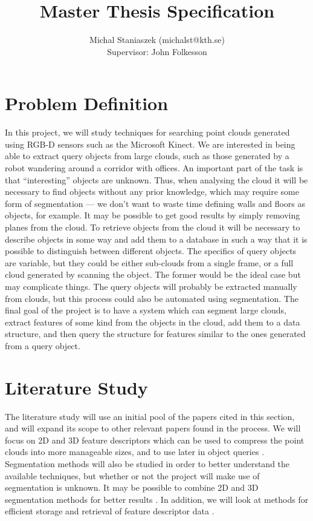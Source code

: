 \documentclass[10pt,a4paper]{article}
\author{Michal Staniaszek (michalst@kth.se)\\ Supervisor: John Folkesson}
\title{Master Thesis Specification}
\begin{document}
\maketitle
\section{Problem Definition}
In this project, we will study techniques for searching point clouds generated
using RGB-D sensors such as the Microsoft Kinect. We are interested in being
able to extract query objects from large clouds, such as those generated by a
robot wandering around a corridor with offices. An important part of the task is
that ``interesting'' objects are unknown. Thus, when analysing the cloud it will
be necessary to find objects without any prior knowledge, which may require some
form of segmentation --- we don't want to waste time defining walls and floors
as objects, for example. It may be possible to get good results by simply
removing planes from the cloud. To retrieve objects from the cloud it will be
necessary to describe objects in some way and add them to a database in such a
way that it is possible to distinguish between different objects. The specifics
of query objects are variable, but they could be either sub-clouds from a single
frame, or a full cloud generated by scanning the object. The former would be the
ideal case but may complicate things. The query objects will probably be
extracted manually from clouds, but this process could also be automated using
segmentation. The final goal of the project is to have a system which can
segment large clouds, extract features of some kind from the objects in the
cloud, add them to a data structure, and then query the structure for features
similar to the ones generated from a query object.
\section{Literature Study}
The literature study will use an initial pool of the papers cited in this
section, and will expand its scope to other relevant papers found in the
process. We will focus on 2D and 3D feature descriptors which can be used to
compress the point clouds into more manageable sizes, and to use later in object
queries \cite{saenko2011practical, lai2011scalable, wohlkinger2011shape,
  mueller2013recognition, bo2011hierarchical}. Segmentation methods will also be
studied in order to better understand the available techniques, but whether or
not the project will make use of segmentation is unknown. It may be possible to
combine 2D and 3D segmentation methods for better results
\cite{haris1998watershed, woo2002new, rabbani2006segmentation}. In addition, we
will look at methods for efficient storage and retrieval of feature descriptor
data \cite{nister2006scalable, philbin2007object}.
\end{document}
